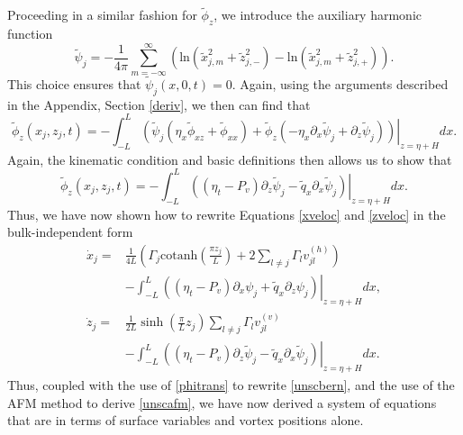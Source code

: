\documentclass[a4paper,11pt]{article}
\newcommand{\p}{\partial}
\begin{document}
Proceeding in a similar fashion for $\tilde{\phi}_{z}$, we introduce the auxiliary harmonic function
\[
\tilde{\psi}_{j} = -\frac{1}{4\pi}\sum_{m=-\infty}^{\infty} \left( \mbox{ln}\left( \tilde{x}_{j,m}^{2} + \tilde{z}_{j,-}^{2}  \right) - \mbox{ln}\left( \tilde{x}_{j,m}^{2} + \tilde{z}_{j,+}^{2} \right)\right).
\]
This choice ensures that $\tilde{\psi}_{j}(x,0,t) = 0$.  Again, using the arguments described in the Appendix, Section \ref{deriv}, we then can find that
\[
\tilde{\phi}_{z}(x_{j},z_{j},t) = -\int_{-L}^{L}\left.\left( \tilde{\psi}_{j}\left(\eta_{x}\tilde{\phi}_{xz}+\tilde{\phi}_{xx}\right)+\tilde{\phi}_{z}\left(-\eta_{x}\p_{x}\tilde{\psi}_{j}+\p_{z}\tilde{\psi}_{j}\right) \right)\right|_{z=\eta+H} dx.
\]
Again, the kinematic condition and basic definitions then allows us to show that
\[
\tilde{\phi}_{z}(x_{j},z_{j},t) = -\int_{-L}^{L}\left.\left( \left(\eta_{t}-P_{v}\right)\p_{z}\tilde{\psi}_{j} - \tilde{q}_{x}\p_{x}\tilde{\psi}_{j} \right)\right|_{z=\eta+H} dx.
\]
Thus, we have now shown how to rewrite Equations \eqref{xveloc} and \eqref{zveloc} in the bulk-independent form 
\begin{align}
\dot{x}_{j} = & \frac{1}{4L}\left(  \Gamma_{j}\mbox{cotanh}\left(\frac{\pi z_{j}}{L} \right)+2\sum_{l\neq j}\Gamma_{l}v_{jl}^{(h)} \right)\nonumber\\
&  -\int_{-L}^{L}\left.\left(\left(\eta_{t}-P_{v}\right)\p_{x}\psi_{j} + \tilde{q}_{x}\p_{z}\psi_{j} \right)\right|_{z=\eta + H} dx, \label{xdotb}\\
\dot{z}_{j} = &  \frac{1}{2L}\sinh\left(\frac{\pi}{L}z_{j}\right)\sum_{l\neq j} \Gamma_{l} v_{jl}^{(v)}\nonumber\\
& - \int_{-L}^{L}\left.\left( \left(\eta_{t}-P_{v}\right)\p_{z}\tilde{\psi}_{j} - \tilde{q}_{x}\p_{x}\tilde{\psi}_{j} \right)\right|_{z=\eta + H} dx. \label{zdotb}
\end{align}
Thus, coupled with the use of \eqref{phitrans} to rewrite \eqref{unscbern}, and the use of the AFM method to derive \eqref{unscafm}, we have now derived a system of equations that are in terms of surface variables and vortex positions alone.  
\end{document}
